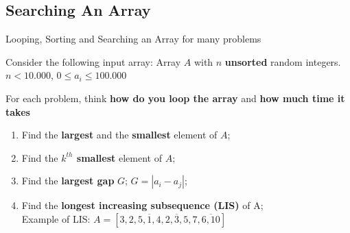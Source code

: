 \subsection{Searching An Array}
\begin{frame}{Looping, Sorting and Searching an Array for many problems}

  \begin{block}{Consider the following input array:}
    Array $A$ with $n$ {\bf unsorted} random integers. $n < 10.000$, $0 \leq a_i \leq 100.000$
  \end{block}\bigskip

  For each problem, think {\bf how do you loop the array} and {\bf how much time it takes}
  \begin{enumerate}
  \item Find the {\bf largest} and the {\bf smallest} element of $A$;
  \item Find the {\bf $k^{th}$ smallest} element of $A$;
  \item Find the {\bf largest gap} $G$; $G = |a_i-a_j|$;
  \item Find the {\bf longest increasing subsequence (LIS)} of A;\\
    \hfill Example of LIS: $A = [3,2,5,\overline1,4,\overline{2, 3, 5},7,\overline{6,10}]$
  \end{enumerate}
\end{frame}

